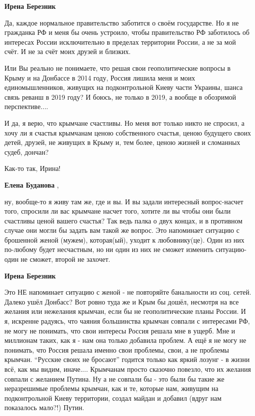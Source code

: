 \begin{itemize}
\begin{itemize}
\textbf{Ирена Березник} 

Да, каждое нормальное правительство заботится о своём государстве. Но я не
гражданка РФ и меня бы очень устроило, чтобы правительство РФ заботилось об
интересах России исключительно в пределах территории России, а не за мой счёт.
И не за счёт моих друзей и близких.

Или Вы реально не понимаете, что решая свои геополитические вопросы в Крыму и
на Донбассе в 2014 году, Россия лишила меня и моих единомышленников, живущих на
подконтрольной Киеву части Украины, шанса связь реванш в 2019 году? И боюсь, не
только в 2019, а вообще в обозримой перспективе....

И да, я верю, что крымчане счастливы. Но меня вот только никто не спросил, а
хочу ли я счастья крымчанам ценою собственного счастья, ценою будущего своих
детей, друзей, не живущих в Крыму и, тем более, ценою жизней и сломанных судеб,
дончан?

Как-то так, Ирина!


\textbf{Елена Буданова} ,

ну, вообще-то я живу там же, где и вы. И вы задали интересный вопрос-насчет
того, спросили ли вас крымчане насчет того, хотите ли вы чтобы они были счастливы
ценой вашего счастья? Так ведь палка о двух концах, и в противном случае они
могли бы задать вам такой же вопрос. Это напоминает ситуацию с брошенной женой
(мужем), которая(ый), уходит к любовнику(це). Один из них по-любому будет
несчастным, но ни один из них не сможет изменить ситуацию-один не сможет, второй
не захочет.

\textbf{Ирена Березник} 

Это НЕ напоминает ситуацию с женой - не повторяйте банальности из соц. сетей.
Далеко ушёл Донбасс? Вот ровно туда же и Крым бы дошёл, несмотря на все желания
или нежелания крымчан, если бы не геополитические планы России. И я, искренне
радуясь, что чаяния большинства крымчан совпали с интересами РФ, не могу не
понимать, что свои интересы Россия решала мне в ущерб. Мне и миллионам таких,
как я - нам она только добавила проблем. А ещё я не могу не понимать, что
Россия решала именно свои проблемы, свои, а не проблемы крымчан. \enquote{Русские своих
не бросают} годится только как яркий лозунг - в жизни всё, как мы видим,
иначе.... Крымчанам просто сказочно повезло, что их желания совпали с желанием
Путина. Ну а не совпали бы - это были бы такие же неразрешимые проблемы
крымчан, как и те, которые нам, живущим на подконтрольной Киеву территории,
создал майдан и добавил (вдруг нам показалось мало?!) Путин.


\end{itemize}
\end{itemize}

